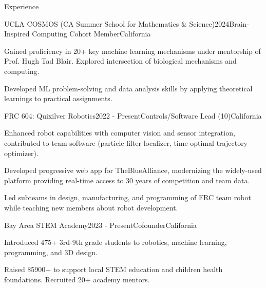 \documentclass[
  11pt, %
]{resume} %
\begin{document}
\sloppy


\begin{rSection}{Experience}


  \begin{rSubsection}{UCLA COSMOS (CA Summer School for Mathematics \& Science)}{2024}{Brain-Inspired Computing Cohort Member}{California}
    
    \item Gained proficiency in 20+ key machine learning mechanisms under mentorship of Prof. Hugh Tad Blair. Explored intersection of biological mechanisms and computing.
    
    \item Developed ML problem-solving and data analysis skills by applying theoretical learnings to practical assignments.
    
  \end{rSubsection}
        
  \begin{rSubsection}{FRC 604: Quixilver Robotics}{2022 - Present}{Controls/Software Lead (10)}{California}
    
    \item Enhanced robot capabilities with computer vision and sensor integration, contributed to team software (particle filter localizer, time-optimal trajectory optimizer).
    
    \item Developed progressive web app for TheBlueAlliance, modernizing the widely-used platform providing real-time access to 30 years of competition and team data.
    
    \item Led subteams in design, manufacturing, and programming of FRC team robot while teaching new members about robot development.
    
  \end{rSubsection}
        
  \begin{rSubsection}{Bay Area STEM Academy}{2023 - Present}{Cofounder}{California}
    
    \item Introduced 475+ 3rd-9th grade students to robotics, machine learning, programming, and 3D design.
    
    \item Raised \$5900+ to support local STEM education and children health foundations. Recruited 20+ academy mentors.
    
  \end{rSubsection}
        
	
\end{rSection}
\end{document}
